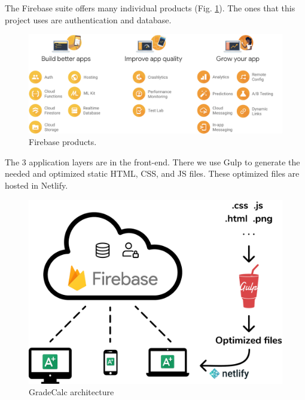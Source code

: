 \clearpage\newpage\noindent
The Firebase suite offers many individual products (Fig. \ref{fig:firebase-products}). The ones that this project uses are authentication and database.

\begin{figure}[H]
    \center
    \includegraphics[width=0.95\columnwidth]{media/firebase-products-cropped.png}
    \caption{Firebase products. \cite{firebase-article}}
    \label{fig:firebase-products}
\end{figure}


\noindent
The 3 application layers are in the front-end. There we use Gulp to generate the needed and optimized static HTML, CSS, and JS files. These optimized files are hosted in Netlify.

\vfill
\begin{figure}[H]
    \center
    \includegraphics[width=0.85\columnwidth]{media/diagrams/architecture.pdf}
    \caption{GradeCalc architecture}
    \label{fig:architecture_diagram}
\end{figure}
\vfill





